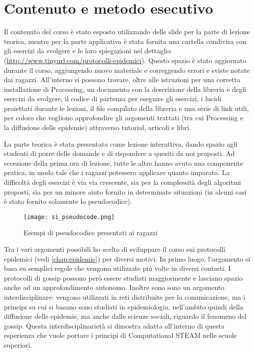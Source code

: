 \section{Contenuto e metodo esecutivo} 
Il contenuto del corso è stato esposto utilizzando delle slide per la parte di lezione teorica, mentre per la parte applicativa è stata fornita una cartella condivisa con gli esercizi da svolgere e le loro spiegazioni nel dettaglio (\href{http://www.tinyurl.com/protocolli-epidemici}{http://www.tinyurl.com/protocolli-epidemici}). Questo spazio è stato aggiornato durante il corso, aggiungendo nuovo materiale e correggendo errori e sviste notate dai ragazzi. All'interno si possono trovare, oltre alle istruzioni per una corretta installazione di Processing, un documento con la descrizione della libreria e degli esercizi da svolgere, il codice di partenza per eseguire gli esercizi, i lucidi proiettati durante le lezioni, il file compilato della libreria e una serie di link utili, per coloro che vogliono approfondire gli argomenti trattati (tra cui Processing e la diffusione delle epidemie) attraverso tutorial, articoli e libri. 

La parte teorica è stata presentata come lezione interattiva, dando spazio agli studenti di porre delle domande e di rispondere a quesiti da noi proposti. Ad eccezione della prima ora di lezione, tutte le altre hanno avuto una componente pratica, in modo tale che i ragazzi potessero applicare quanto imparato. La difficoltà degli esercizi è via via crescente, sia per la complessità degli algoritmi proposti, sia per un minore aiuto fornito in determinate situazioni (in alcuni casi è stato fornito solamente lo pseudocodice). 

\begin{figure}[!ht]
    \centering
    \texttt{[image: si\_pseudocode.png]}
    \caption{Esempi di pseudocodice presentati ai ragazzi \cite{montresor}}
    \label{}
\end{figure}

Tra i vari argomenti possibili ho scelto di sviluppare il corso sui protocolli epidemici (vedi \autoref{chap:epidemic}) per diversi motivi. In primo luogo, l’argomento si basa su semplici regole che vengono utilizzate più volte in diversi contesti. I protocolli di gossip possono però essere studiati maggiormente e lasciano spazio anche ad un approfondimento autonomo. Inoltre sono sono un argomento interdisciplinare: vengono utilizzati in reti distribuite per la comunicazione, ma i principi su cui si basano sono studiati in epidemiologia, nell’ambito quindi della diffusione delle epidemie, ma anche dalle scienze sociali, riguardo il fenomeno del gossip. Questa interdisciplinarietà si dimostra adatta all’interno di questa esperienza che vuole portare i principi di Computational STEAM nelle scuole superiori.

